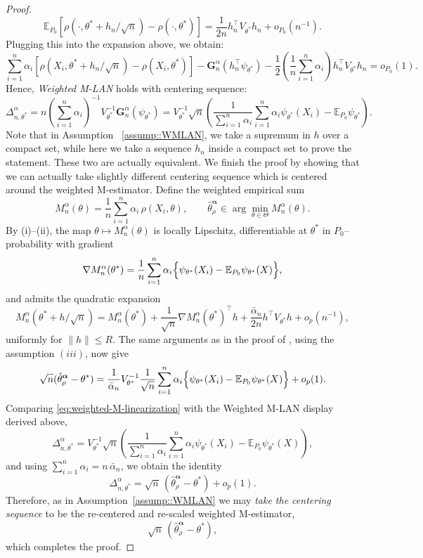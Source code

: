 \documentclass[11pt, oneside]{amsart}
\theoremstyle{definition}   %
\newcommand{\E}{\mathbb{E}}
\newcommand{\loss}{\rho}
\newcommand{\mestimator}{\hat{\theta}^{\boldsymbol{\alpha}}_{\loss }}
\begin{document}
\begin{proof}
    \[
    \E_{P_0} [\rho(\cdot, \theta^* + h_n/\sqrt{n}) - \rho(\cdot, \theta^*)] = \frac{1}{2n} h_n^\top V_{\theta^*} h_n + o_{P_0}(n^{-1}).
    \]
    Plugging this into the expansion above, we obtain:
    \[
    \sum_{i=1}^n \alpha_i [\rho(X_i, \theta^* + h_n/\sqrt{n}) - \rho(X_i, \theta^*)] - \textbf{G}_n^\alpha (h_n^\top \psi_{\theta^*}) - \frac{1}{2} \left( \frac{1}{n} \sum_{i=1}^n \alpha_i \right) h_n^\top V_{\theta^*} h_n = o_{P_0}(1).
    \]
    Hence, \textit{Weighted M-LAN} holds with centering sequence:
    \[
    \Delta_{n,\theta^*}^\alpha = n \left ( \sum_{i=1}^n \alpha_i \right )^{-1} V_{\theta^*}^{-1} \textbf{G}_n^\alpha (\psi_{\theta^*}) = V_{\theta^*}^{-1} \sqrt{n} \left( \frac{1}{\sum_{i=1}^n \alpha_i} \sum_{i=1}^n \alpha_i \psi_{\theta^*}(X_i) - \E_{P_0} \psi_{\theta^*} \right).
    \]
    Note that in Assumption ~\ref{assump::WMLAN}, we take a supremum in \( h \) over a compact set, while here we take a sequence \( h_n\) inside a compact set to prove the statement. These two are actually equivalent.  We finish the proof by showing that we can actually take slightly different centering sequence which is centered around the weighted M-estimator.
    Define the weighted empirical sum
    \[
    M_n^\alpha(\theta) = \frac{1}{n}\sum_{i=1}^n \alpha_i\,\rho(X_i,\theta),
    \qquad 
    \mestimator\in\arg\min_{\theta\in\Theta} M_n^\alpha(\theta).
    \]
    By (i)–(ii), the map $\theta\mapsto M_n^\alpha(\theta)$ is locally Lipschitz, differentiable at $\theta^*$ in $P_0$–probability with gradient
    \[
    \nabla M_n^\alpha(\theta^*) 
    = \frac{1}{n}\sum_{i=1}^n \alpha_i\Bigl\{\psi_{\theta^*}(X_i)-\E_{P_0}\psi_{\theta^*}(X)\Bigr\},
    \]
    and admits the quadratic expansion
    \[
    M_n^\alpha(\theta^*+h/\sqrt{n})
    = M_n^\alpha(\theta^*) 
    + \frac{1}{\sqrt{n}}\nabla M_n^\alpha(\theta^*)^\top h 
    + \frac{\bar\alpha_n}{2n}h^\top V_{\theta^*}h 
    + o_p(n^{-1}) ,
    \]
    uniformly for $\|h\|\le R$. The same arguments as in the proof of \cite[Thm.\ 5.23]{Vaart_1998}, using the assumption \( (iii) \), now give
    \begin{equation}
    \label{eq:weighted-M-linearization}
        \sqrt{n}(\mestimator - \theta^*) 
        = 
        \frac{1}{\bar\alpha_n} V_{\theta^*}^{-1} \frac{1}{\sqrt{n}}\sum_{i=1}^n \alpha_i\Bigl\{\psi_{\theta^*}(X_i)-\E_{P_0}\psi_{\theta^*}(X)\Bigr\}
        + o_p(1).
    \end{equation}
    Comparing \eqref{eq:weighted-M-linearization} with the Weighted M-LAN display derived above,
    \[
        \Delta_{n,\theta^*}^{\alpha}
        = 
        V_{\theta^*}^{-1}\sqrt{n} \left(
        \frac{1}{\sum_{i=1}^n\alpha_i}\sum_{i=1}^n \alpha_i \psi_{\theta^*}(X_i) - \E_{P_0}\psi_{\theta^*}(X)\right),
    \]
    and using $\sum_{i=1}^n\alpha_i=n\,\bar\alpha_n$, we obtain the identity
    \[
        \Delta_{n,\theta^*}^{\alpha}
        = 
        \sqrt{n}\,(\mestimator - \theta^*) + o_p(1).
    \]
    Therefore, as in Assumption~\ref{assump::WMLAN} we may \emph{take the centering sequence} to be the re-centered and re-scaled weighted M-estimator,
    \[
        \sqrt{n}\,(\mestimator - \theta^*),
    \]
    which completes the proof.
\end{proof}
\end{document}
